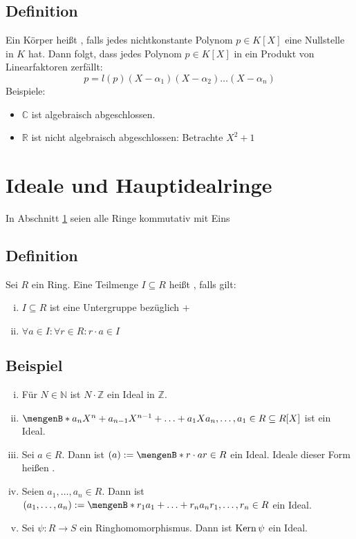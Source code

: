 \subsection[Definition: Algebraisch abgeschlossener Körper]{Definition} %
\label{sub:511}
Ein Körper heißt , falls jedes nichtkonstante Polynom $p \in K[X]$ eine Nullstelle in $K$ hat. Dann folgt, dass jedes Polynom $p \in K[X]$
in ein Produkt von Linearfaktoren zerfällt:
\[
	p = l(p) (X- \alpha_1) (X- \alpha_2) \ldots (X- \alpha_n)
\]
Beispiele: 
\begin{itemize}
	\item $\mathds{C}$ ist algebraisch abgeschlossen.
	\item $\mathds{R}$ ist nicht algebraisch abgeschlossen: Betrachte $X^2+1$ 
\end{itemize}
\newpage
\section{Ideale und Hauptidealringe} %
\label{sec:6}
In Abschnitt \ref{sec:6} seien alle Ringe kommutativ mit Eins
\subsection[Definition: Ideal]{Definition} %
\label{sub:61}
Sei $R$ ein Ring. Eine Teilmenge $I \subseteq R$ heißt , falls gilt: 
\begin{enumerate}[(i)]
	\item $I \subseteq R$ ist eine Untergruppe bezüglich $+$
	\item $\forall a \in I : \forall r \in R : r \cdot a \in I$
\end{enumerate} 

\subsection[Beispiele für Ideale]{Beispiel} %
\label{sub:62}
\begin{enumerate}[(i)]
	\item Für $N \in \mathds{N}$ ist $N \cdot \mathds{Z}$ ein Ideal in $\mathds{Z}$.
	\item $\set[{a_n X^n + a_{n-1}X^{n-1} + \ldots + a_1 X}]{a_n, \ldots , a_1 \in R} \subseteq R[X]$ ist ein Ideal.
	\item Sei $a \in R$. Dann ist $(a) := \set[r \cdot a]{r \in R} $ ein Ideal. Ideale dieser Form heißen .
	\item Seien $a_1, \ldots , a_n \in R$. Dann ist $(a_1, \ldots ,a_n) := \set[r_1 a_1 + \ldots + r_n a_n]{r_1, \ldots , r_n \in R} $ ein Ideal.
	\item Sei $\psi : R \to S$ ein Ringhomomorphismus. Dann ist $\operatorname{Kern} \psi$ ein Ideal.
\end{enumerate}

